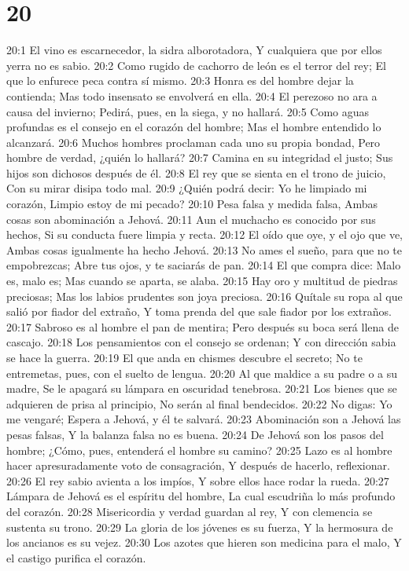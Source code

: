 \chapter{20}


20:1 El vino es escarnecedor, la sidra alborotadora,  
Y cualquiera que por ellos yerra no es sabio.  
20:2 Como rugido de cachorro de león es el terror del rey;  
El que lo enfurece peca contra sí mismo.  
20:3 Honra es del hombre dejar la contienda;  
Mas todo insensato se envolverá en ella.  
20:4 El perezoso no ara a causa del invierno;  
Pedirá, pues, en la siega, y no hallará.  
20:5 Como aguas profundas es el consejo en el corazón del hombre;  
Mas el hombre entendido lo alcanzará.  
20:6 Muchos hombres proclaman cada uno su propia bondad,  
Pero hombre de verdad, ¿quién lo hallará?  
20:7 Camina en su integridad el justo;  
Sus hijos son dichosos después de él.  
20:8 El rey que se sienta en el trono de juicio,  
Con su mirar disipa todo mal.  
20:9 ¿Quién podrá decir: Yo he limpiado mi corazón,  
Limpio estoy de mi pecado?  
20:10 Pesa falsa y medida falsa,  
Ambas cosas son abominación a Jehová.  
20:11 Aun el muchacho es conocido por sus hechos,  
Si su conducta fuere limpia y recta.  
20:12 El oído que oye, y el ojo que ve,  
Ambas cosas igualmente ha hecho Jehová.  
20:13 No ames el sueño, para que no te empobrezcas;  
Abre tus ojos, y te saciarás de pan.  
20:14 El que compra dice: Malo es, malo es;  
Mas cuando se aparta, se alaba.  
20:15 Hay oro y multitud de piedras preciosas;  
Mas los labios prudentes son joya preciosa.  
20:16 Quítale su ropa al que salió por fiador del extraño,  
Y toma prenda del que sale fiador por los extraños.  
20:17 Sabroso es al hombre el pan de mentira;  
Pero después su boca será llena de cascajo.  
20:18 Los pensamientos con el consejo se ordenan;  
Y con dirección sabia se hace la guerra.  
20:19 El que anda en chismes descubre el secreto;  
No te entremetas, pues, con el suelto de lengua.  
20:20 Al que maldice a su padre o a su madre,  
Se le apagará su lámpara en oscuridad tenebrosa.  
20:21 Los bienes que se adquieren de prisa al principio, 
No serán al final bendecidos.  
20:22 No digas: Yo me vengaré;  
Espera a Jehová, y él te salvará.  
20:23 Abominación son a Jehová las pesas falsas,  
Y la balanza falsa no es buena.  
20:24 De Jehová son los pasos del hombre;  
¿Cómo, pues, entenderá el hombre su camino?  
20:25 Lazo es al hombre hacer apresuradamente voto de consagración,  
Y después de hacerlo, reflexionar.  
20:26 El rey sabio avienta a los impíos,  
Y sobre ellos hace rodar la rueda.  
20:27 Lámpara de Jehová es el espíritu del hombre,  
La cual escudriña lo más profundo del corazón.  
20:28 Misericordia y verdad guardan al rey,  
Y con clemencia se sustenta su trono.  
20:29 La gloria de los jóvenes es su fuerza,  
Y la hermosura de los ancianos es su vejez.  
20:30 Los azotes que hieren son medicina para el malo,  
Y el castigo purifica el corazón.  

